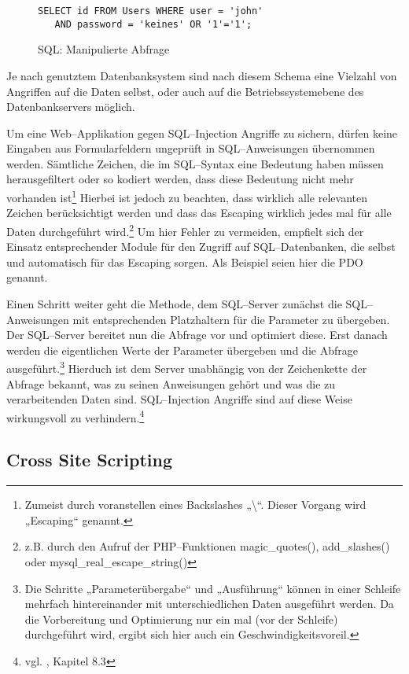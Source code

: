 \begin{figure}[h]
\begin{verbatim}
SELECT id FROM Users WHERE user = 'john' 
   AND password = 'keines' OR '1'='1';
\end{verbatim}
\caption{SQL: Manipulierte Abfrage}
\label{abb:injsql}
\end{figure}

Je nach genutztem Datenbanksystem sind nach diesem Schema eine Vielzahl von Angriffen auf die Daten selbst, oder auch auf die Betriebssystemebene des Datenbankservers möglich.

Um eine Web--Applikation gegen SQL--Injection Angriffe zu sichern, dürfen keine Eingaben aus Formularfeldern ungeprüft in SQL--Anweisungen übernommen werden. Sämtliche Zeichen, die im SQL--Syntax eine Bedeutung haben müssen herausgefiltert oder so kodiert werden, dass diese Bedeutung nicht mehr vorhanden ist\footnote{Zumeist durch voranstellen eines Backslashes „\textbackslash“. Dieser Vorgang wird „Escaping“ genannt.} Hierbei ist jedoch zu beachten, dass wirklich alle relevanten Zeichen berücksichtigt werden und dass das Escaping wirklich jedes mal für alle Daten durchgeführt wird.\footnote{z.B. durch den Aufruf der PHP--Funktionen magic\_quotes(), add\_slashes() oder mysql\_real\_escape\_string()}
Um hier Fehler zu vermeiden, empfielt sich der Einsatz entsprechender Module für den Zugriff auf SQL--Datenbanken, die selbst und automatisch für das Escaping sorgen. Als Beispiel seien hier die \ac{PDO} genannt.

Einen Schritt weiter geht die Methode, dem SQL--Server zunächst die SQL--Anweisungen mit entsprechenden Platzhaltern für die Parameter zu übergeben. Der SQL--Server bereitet nun die Abfrage vor und optimiert diese. Erst danach werden die eigentlichen Werte der Parameter übergeben und die Abfrage ausgeführt.\footnote{Die Schritte „Parameterübergabe“ und „Ausführung“ können in einer Schleife mehrfach hintereinander mit unterschiedlichen Daten ausgeführt werden. Da die Vorbereitung und Optimierung nur ein mal (vor der Schleife) durchgeführt wird, ergibt sich hier auch ein Geschwindigkeitsvoreil.} Hierduch ist dem Server unabhängig von der Zeichenkette der Abfrage bekannt, was zu seinen Anweisungen gehört und was die zu verarbeitenden Daten sind. SQL--Injection Angriffe sind auf diese Weise wirkungsvoll zu verhindern.\footnote{vgl. \cite{clarke}, Kapitel 8.3}

\subsection{Cross Site Scripting}

